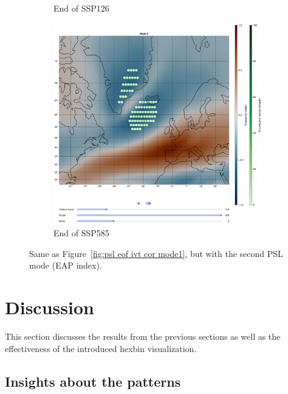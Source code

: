 \begin{figure}[!htb]
\begin{subfigure}[b]{0.32\textwidth}
    \caption{End of SSP126} 
    \label{fig:psl eof ivt cor ssp126 mode2}
  \end{subfigure}
  \begin{subfigure}[b]{0.32\textwidth}
    \includegraphics[width=\textwidth]{figures/psl_ivt_cor_mode2_ssp585.png}
    \caption{End of SSP585}
    \label{fig:psl eof ivt cor ssp585 mode2}
  \end{subfigure}
  \caption{Same as Figure~\ref{fig:psl eof ivt cor mode1}, but with the second PSL mode (EAP index).}
  \label{fig:psl eof ivt cor mode2}
\end{figure}



\section{Discussion}
\label{sec:discussion}

This section discusses the results from the previous sections as well as the effectiveness of the introduced hexbin visualization. 

\subsection{Insights about the patterns}

